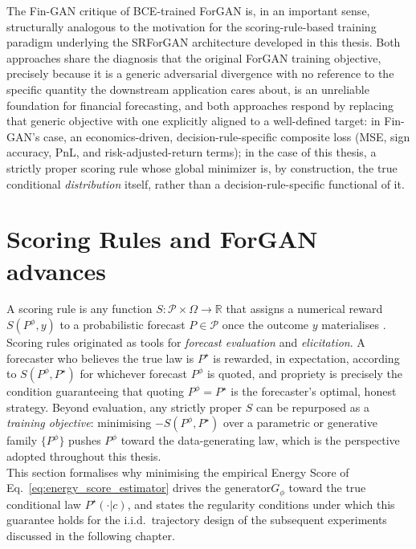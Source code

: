 The Fin-GAN critique of BCE-trained ForGAN is,
in an important sense, structurally analogous to the motivation 
for the scoring-rule-based training paradigm underlying the SRForGAN architecture developed in this thesis.
Both approaches share the diagnosis that the original ForGAN training objective,
precisely because it is a generic adversarial divergence with no reference 
to the specific quantity the downstream application 
cares about, is an unreliable foundation for financial forecasting,
and both approaches respond by replacing that generic objective with one explicitly aligned 
to a well-defined target: 
in Fin-GAN's case, an economics-driven, 
decision-rule-specific composite loss 
(MSE, sign accuracy, PnL, and risk-adjusted-return terms); 
in the case of this thesis, a strictly proper scoring rule whose global minimizer is, 
by construction, the true conditional \emph{distribution} itself, 
rather than a decision-rule-specific functional of it.

\section{Scoring Rules and ForGAN advances}







\label{sec:energy_score_theory}
A scoring rule is any function $S:\mathcal P\times\Omega\to\mathbb R$ 
that assigns a numerical reward $S(P^\phi,y)$ to a 
probabilistic forecast $P\in\mathcal P$ once the 
outcome $y$ materialises \cite{background:scoring_rules}. 
Scoring rules originated as tools for \emph{forecast evaluation} and 
\emph{elicitation}. A forecaster who 
believes the true law is $P^\star$ is rewarded, 
in expectation, according to $S(P^\phi,P^\star)$ for
 whichever forecast $P^\phi$ is quoted, and 
 propriety is precisely the condition 
 guaranteeing that quoting $P^\phi =P^\star$ is the 
 forecaster's optimal, honest strategy.  
 Beyond evaluation, any strictly proper $S$ 
 can be repurposed as a \emph{training objective}: 
 minimising $-S(P^\phi, P^\star)$ over a parametric or 
 generative family $\{P^\phi\}$ pushes $P^\phi$ 
 toward the data-generating law, which is the 
 perspective adopted throughout this thesis.\\

This section formalises why minimising the empirical 
Energy Score of Eq.~\eqref{eq:energy_score_estimator} 
drives the generator$G_\phi$ toward the 
true conditional law $P^\star(\cdot|c)$, 
and states the regularity conditions under 
which this guarantee holds for the i.i.d.\ 
trajectory design of the subsequent experiments discussed in the following chapter.\\

